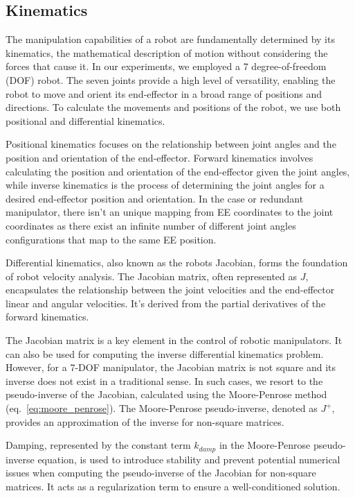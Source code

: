 \documentclass[a4paper]{article}
\begin{document}
\subsection{Kinematics}

The manipulation capabilities of a robot are fundamentally determined by its kinematics, the mathematical description of motion without considering the forces that cause it. In our experiments, we employed a 7 degree-of-freedom (DOF) robot. The seven joints provide a high level of versatility, enabling the robot to move and orient its end-effector in a broad range of positions and directions. To calculate the movements and positions of the robot, we use both positional and differential kinematics.

Positional kinematics focuses on the relationship between joint angles and the position and orientation of the end-effector. Forward kinematics involves calculating the position and orientation of the end-effector given the joint angles, while inverse kinematics is the process of determining the joint angles for a desired end-effector position and orientation. In the case or redundant manipulator, there isn't an unique mapping from EE coordinates to the joint coordinates as there exist an infinite number of different joint angles configurations that map to the same EE position.

Differential kinematics, also known as the robots Jacobian, forms the foundation of robot velocity analysis. The Jacobian matrix, often represented as $J$, encapsulates the relationship between the joint velocities and the end-effector linear and angular velocities. It's derived from the partial derivatives of the forward kinematics.

The Jacobian matrix is a key element in the control of robotic manipulators. It can also be used for computing the inverse differential kinematics problem. However, for a 7-DOF manipulator, the Jacobian matrix is not square and its inverse does not exist in a traditional sense. In such cases, we resort to the pseudo-inverse of the Jacobian, calculated using the Moore-Penrose method (eq.~\ref{eq:moore_penrose}). The Moore-Penrose pseudo-inverse, denoted as $J^+$, provides an approximation of the inverse for non-square matrices. 

Damping, represented by the constant term $k_{damp}$ in the Moore-Penrose pseudo-inverse equation, is used to introduce stability and prevent potential numerical issues when computing the pseudo-inverse of the Jacobian for non-square matrices. It acts as a regularization term to ensure a well-conditioned solution.
\end{document}
